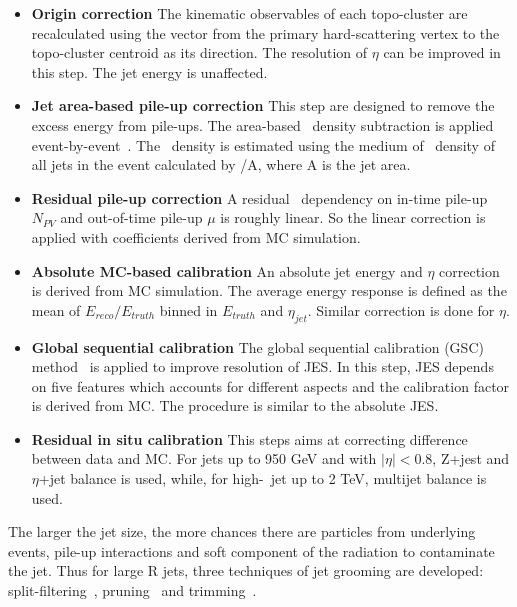 \begin{itemize}
\item \textbf{Origin correction} The kinematic observables of each topo-cluster are recalculated using the vector from the primary hard-scattering vertex to the topo-cluster centroid as its direction. The resolution of $\eta$ can be improved in this step. The jet energy is unaffected.
\item \textbf{Jet area-based pile-up correction} This step are designed to remove the excess energy from pile-ups. The area-based \pt~density subtraction is applied event-by-event~\cite{Cacciari:2007fd}. The \pt~density is estimated using the medium of \pt~density of all jets in the event calculated by \pt/A, where A is the jet area.
\item \textbf{Residual pile-up correction} A residual \pt~dependency on in-time pile-up $N_{PV}$ and out-of-time pile-up $\mu$ is roughly linear. So the linear correction is applied with coefficients derived from MC simulation. 
\item \textbf{Absolute MC-based calibration} An absolute jet energy and $\eta$ correction is derived from MC simulation. The average energy response is defined as the mean of $E_{reco}/E_{truth}$ binned in $E_{truth}$ and $\eta_{jet}$. Similar correction is done for $\eta$. 
\item \textbf{Global sequential calibration} The global sequential calibration (GSC) method~\cite{Aad:2011he} is applied to improve resolution of JES. In this step, JES depends on five features which accounts for different aspects and the calibration factor is derived from MC. The procedure is similar to the absolute JES.
\item \textbf{Residual in situ calibration} This steps aims at correcting difference between data and MC. For jets up to 950 GeV and with $|\eta| < 0.8$, Z+jest and $\eta$+jet balance is used, while, for high-\pt~jet up to 2 TeV, multijet balance is used.
\end{itemize}
\par The larger the jet size, the more chances there are particles from underlying events, 
pile-up interactions and soft component of the radiation to contaminate the jet. Thus for large R jets, three techniques of jet grooming are developed:
split-filtering~\cite{Butterworth:2008iy}, pruning~\cite{Ellis:2009me} and trimming~\cite{Krohn:2009th}. 

